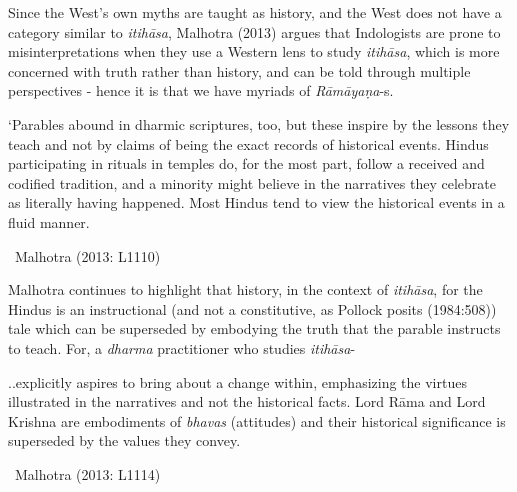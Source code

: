 Since the West’s own myths are taught as history, and the West does not have a category similar to \textit{itihāsa}, Malhotra (2013) argues that Indologists are prone to misinterpretations when they use a Western lens to study \textit{itihāsa}, which is more concerned with truth rather than history, and can be told through multiple perspectives - hence it is that we have myriads of \textit{Rāmāyaṇa}-s.

\begin{myquote}
‘Parables abound in dharmic scriptures, too, but these inspire by the lessons they teach and not by claims of being the exact records of historical events. Hindus participating in rituals in temples do, for the most part, follow a received and codified tradition, and a minority might believe in the narratives they celebrate as literally having happened. Most Hindus tend to view the historical events in a fluid manner.

~\hfill Malhotra (2013: L1110)
\end{myquote}

Malhotra continues to highlight that history, in the context of \textit{itihāsa}, for the Hindus is an instructional (and not a constitutive, as Pollock posits (1984:508)) tale which can be superseded by embodying the truth that the parable instructs to teach. For, a \textit{dharma} practitioner who studies \textit{itihāsa}-

\begin{myquote}
..explicitly aspires to bring about a change within, emphasizing the virtues illustrated in the narratives and not the historical facts. Lord Rāma and Lord Krishna are embodiments of \textit{bhavas} (attitudes) and their historical significance is superseded by the values they convey.

~\hfill Malhotra (2013: L1114)
\end{myquote}

